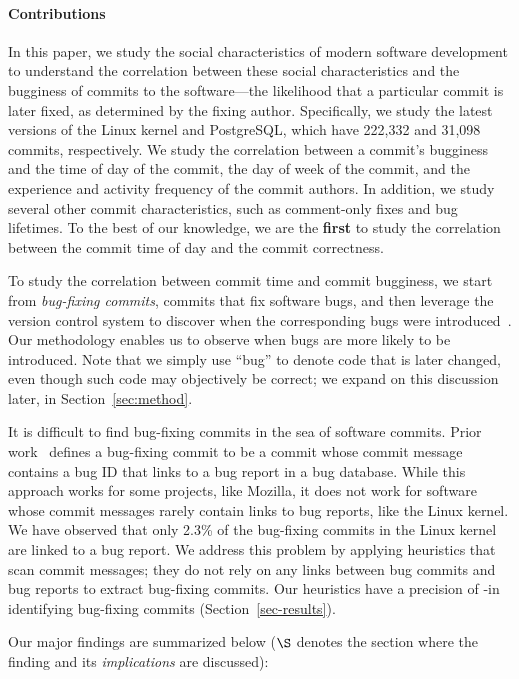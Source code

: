 \paragraph{Contributions}

In this paper, we study the social characteristics of modern software
development to understand the correlation between these social characteristics
and the bugginess of commits to the software---the likelihood that a
particular commit is later fixed, as determined by the fixing author.
Specifically, we study the latest versions of the Linux kernel and PostgreSQL,
which have 222,332 and 31,098 commits, respectively. We study the correlation
between a commit's bugginess and the time of day of the commit, the day of week
of the commit, and the experience and activity frequency of the commit authors.
In addition, we study several other commit characteristics, such as comment-only
fixes and bug lifetimes.  To the best of our knowledge, we are the {\bf first}
to study the correlation between the commit time of day and the commit
correctness.

To study the correlation between commit time and commit bugginess, we start from
{\em bug-fixing commits}, commits that fix software bugs, and then leverage the
version control system to discover when the corresponding bugs were
introduced~\cite{sliwerski-msr-2005}.  Our methodology enables us to observe
when bugs are more likely to be introduced.  Note that we simply use ``bug'' to
denote code that is later changed, even though such code may objectively be
correct; we expand on this discussion later, in Section~\ref{sec:method}.

It is difficult to find bug-fixing commits in the sea of software commits.
Prior work~\cite{sliwerski-msr-2005} defines a bug-fixing commit to be a commit
whose commit message contains a bug ID that links to a bug report in a bug
database. While this approach works for some projects, like Mozilla, it does not
work for software whose commit messages rarely contain links to bug reports,
like the Linux kernel.  We have observed that only 2.3\% of the bug-fixing
commits in the Linux kernel are linked to a bug report. We address this problem
by applying heuristics that scan commit messages; they do not rely on any links
between bug commits and bug reports to extract bug-fixing commits.  Our
heuristics have a precision of \postP-\linuxP in identifying bug-fixing commits
(Section~\ref{sec-results}).

Our major findings are summarized below ($\S$ denotes the section where the
finding and its {\em implications} are discussed):

